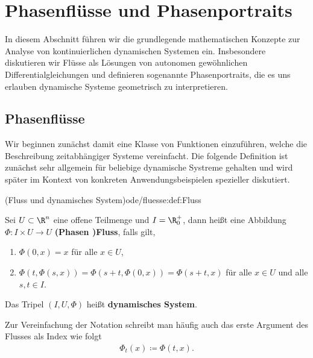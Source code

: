 \documentclass[letterpaper,10pt,english]{jupyterBook}
\begin{document}
\section{Phasenflüsse und Phasenportraits}
\label{\detokenize{ode/fluesse:phasenflusse-und-phasenportraits}}\label{\detokenize{ode/fluesse:s-fluesse}}\label{\detokenize{ode/fluesse::doc}}
\par
In diesem Abschnitt führen wir die grundlegende mathematischen Konzepte zur Analyse von kontinuierlichen dynamischen Systemen ein. Insbesondere diskutieren wir Flüsse als Lösungen von autonomen gewöhnlichen Differentialgleichungen und definieren sogenannte Phasenportraits, die es uns erlauben dynamische Systeme geometrisch zu interpretieren.


\subsection{Phasenflüsse}
\label{\detokenize{ode/fluesse:phasenflusse}}
\par
Wir beginnen zunächst damit eine Klasse von Funktionen einzuführen, welche die Beschreibung zeitabhängiger Systeme vereinfacht.
Die folgende Definition ist zunächst sehr allgemein für beliebige dynamische Systreme gehalten und wird später im Kontext von konkreten Anwendungsbeispielen spezieller diskutiert.
\begin{definition}{(Fluss und dynamisches System)}{ode/fluesse:def:Fluss}



\par
Sei \(U \subset \R^n\) eine offene Teilmenge und \(I=\R^+_0\), dann heißt eine Abbildung \(\Phi:I\times U\rightarrow U\) \textbf{(Phasen )Fluss}, falls gilt,
\begin{enumerate}

\item {} 
\par
\(\Phi(0, x) = x\) für alle \(x\in U\),

\item {} 
\par
\(\Phi(t, \Phi(s,x)) = \Phi(s + t, \Phi(0, x)) = \Phi(s + t, x)\) für alle \(x\in U\) und alle \(s,t\in I\).

\end{enumerate}

\par
Das Tripel \((I, U, \Phi)\) heißt \textbf{dynamisches System}.

\par
Zur Vereinfachung der Notation schreibt man häufig auch das erste Argument des Flusses als Index wie folgt
\begin{align*}
\Phi_t(x) \coloneqq \Phi(t, x).
\end{align*}\end{definition}
\end{document}
